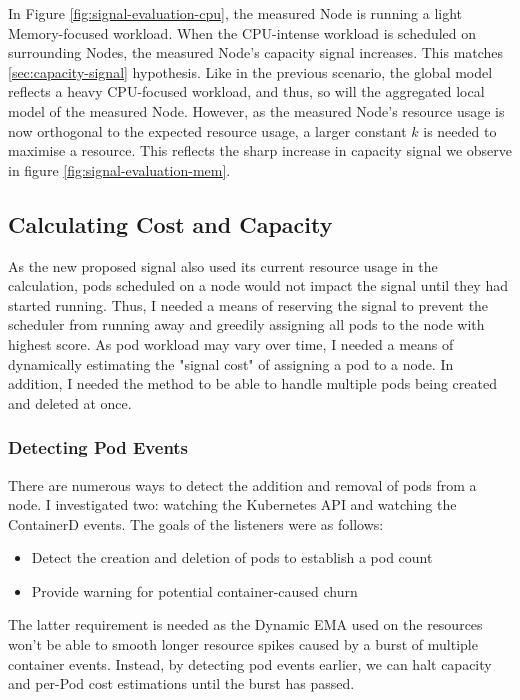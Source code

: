 In Figure \ref{fig:signal-evaluation-cpu}, the measured Node is running a light
Memory-focused workload. When the CPU-intense workload is scheduled on surrounding
Nodes, the measured Node's capacity signal increases. This matches
\ref{sec:capacity-signal} hypothesis. Like in the previous scenario, the global model
reflects a heavy CPU-focused workload, and thus, so will the aggregated local
model of the measured Node. However, as the measured Node's resource usage is
now orthogonal to the expected resource usage, a larger constant $k$ is needed
to maximise a resource. This reflects the sharp increase in capacity signal we
observe in figure \ref{fig:signal-evaluation-mem}.

\subsection{Calculating Cost and Capacity}
As the new proposed signal also used its current resource usage in the
calculation, pods scheduled on a node would not impact the signal until they had
started running. Thus, I needed a means of reserving the signal to prevent the
scheduler from running away and greedily assigning all pods to the node with
highest score. As pod workload may vary over time, I needed a means of
dynamically estimating the "signal cost" of assigning a pod to a node. In
addition, I needed the method to be able to handle multiple pods being created
and deleted at once.

\subsubsection{Detecting Pod Events}
There are numerous ways to detect the addition and removal of pods from a node.
I investigated two: watching the Kubernetes API and watching the ContainerD
events. The goals of the listeners were as follows:
\begin{itemize}
    \item Detect the creation and deletion of pods to establish a pod count
    \item Provide warning for potential container-caused churn
\end{itemize}
The latter requirement is needed as the Dynamic EMA used on the resources won't
be able to smooth longer resource spikes caused by a burst of multiple container
events. Instead, by detecting pod events earlier, we can halt capacity and
per-Pod cost estimations until the burst has passed.

